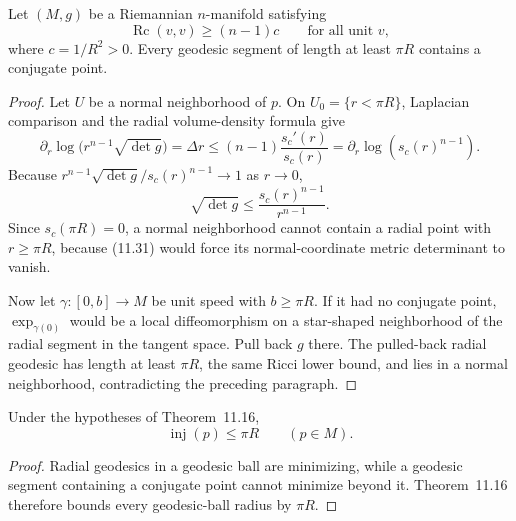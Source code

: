 \begin{theorem}
\label{thm:conjugate-points-ricci-bounded}

Let $(M,g)$ be a Riemannian $n$-manifold satisfying
\[
\operatorname{Rc}(v,v)\geq(n-1)c
\qquad\text{for all unit }v,
\]
where $c=1/R^2>0$. Every geodesic segment of length at least $\pi R$
contains a conjugate point.

\begin{proof}
\sketch Let $U$ be a normal neighborhood of $p$. On
$U_0=\{r<\pi R\}$, Laplacian comparison and the radial volume-density formula
give
\[
\partial_r\log\bigl(r^{n-1}\sqrt{\det g}\bigr)
=\Delta r
\leq(n-1)\frac{s_c'(r)}{s_c(r)}
=\partial_r\log(s_c(r)^{n-1}).
\]
Because
$r^{n-1}\sqrt{\det g}/s_c(r)^{n-1}\to1$ as $r\to0$,
\begin{equation}
\sqrt{\det g}\leq\frac{s_c(r)^{n-1}}{r^{n-1}}.
\tag{11.31}
\end{equation}
Since $s_c(\pi R)=0$, a normal neighborhood cannot contain a radial point
with $r\geq\pi R$, because (11.31) would force its normal-coordinate metric
determinant to vanish.

Now let $\gamma:[0,b]\to M$ be unit speed with $b\geq\pi R$. If it had no
conjugate point, $\exp_{\gamma(0)}$ would be a local diffeomorphism on a
star-shaped neighborhood of the radial segment in the tangent space. Pull
back $g$ there. The pulled-back radial geodesic has length at least $\pi R$,
the same Ricci lower bound, and lies in a normal neighborhood, contradicting
the preceding paragraph.
\end{proof}
\end{theorem}

\begin{corollary}
\label{cor:injectivity-radius-ricci-bounded}

Under the hypotheses of Theorem~11.16,
\[
\operatorname{inj}(p)\leq\pi R
\qquad(p\in M).
\]

\begin{proof}
\sketch Radial geodesics in a geodesic ball are minimizing, while a geodesic
segment containing a conjugate point cannot minimize beyond it. Theorem~11.16
therefore bounds every geodesic-ball radius by $\pi R$.
\end{proof}
\end{corollary}

